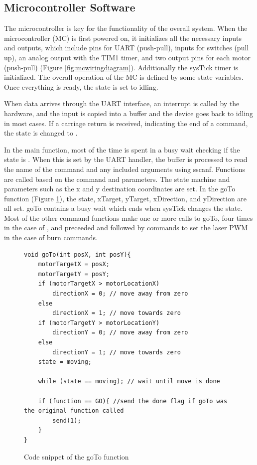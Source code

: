 \documentclass[11pt]{LaTeX-Classes/math-hw}
\begin{document}
\subsection{Microcontroller Software}
The microcontroller is key for the functionality of the overall system.
When the microcontroller (MC) is first powered on, it initializes all the necessary inputs and outputs,
which include pins for UART (push-pull), inputs for switches (pull up),
an analog output with the TIM1 timer,
and two output pins for each motor (push-pull) (Figure \ref{fig:mcwiringdiagram}).
Additionally the sysTick timer is initialized. The overall operation of the MC is defined by some
state variables. Once everything is ready, the state is set to idling.

When data arrives through the UART interface, an interrupt is called by the hardware, and the
input is copied into a buffer and the device goes back to idling in most cases.
If a carriage return is received, indicating the end of a command,
the state is changed to .

In the main function, most of the time is spent in a busy wait checking if the state is .
When this is set by the UART handler,
the buffer is processed to read the name of the command and any included arguments using sscanf.
Functions are called based on the command and parameters.
The state machine and parameters such as the x and y destination coordinates are set.
In the goTo function (Figure \ref{fig:gotoFunction}), the state, xTarget, yTarget, xDirection,
and yDirection are all set.
goTo contains a busy wait which ends when sysTick changes the state.
Most of the other command functions make one or more calls to goTo,
four times in the case of , and preceeded and followed by
commands to set the laser PWM in the case of burn commands.

\begin{figure}[H]
 \begin{center}
   \begin{verbatim}
void goTo(int posX, int posY){
	motorTargetX = posX;
	motorTargetY = posY;
	if (motorTargetX > motorLocationX)
		directionX = 0; // move away from zero
	else
		directionX = 1; // move towards zero
	if (motorTargetY > motorLocationY)
		directionY = 0; // move away from zero
	else
		directionY = 1; // move towards zero
	state = moving;

	while (state == moving); // wait until move is done

	if (function == GO){ //send the done flag if goTo was the original function called
		send(1);
	}
}
   \end{verbatim}
   \caption{Code snippet of the goTo function}
   \label{fig:gotoFunction}
 \end{center}
\end{figure}
\end{document}
